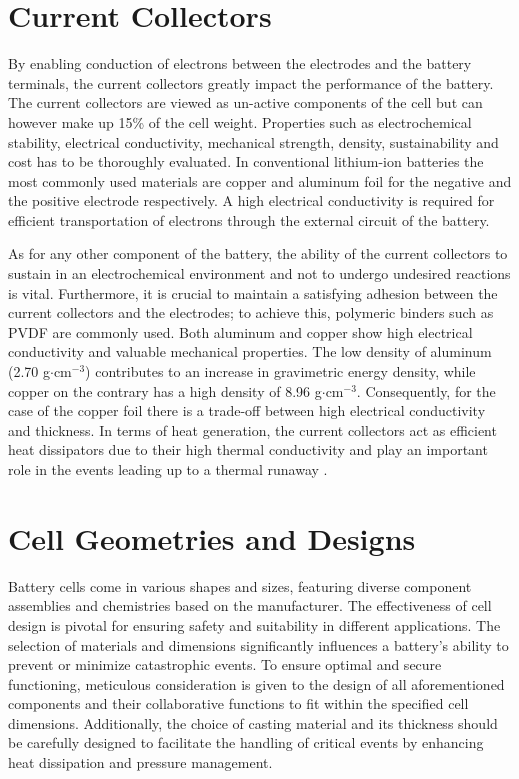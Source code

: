 \section{Current Collectors}
\label{sec:current-collectors}
By enabling conduction of electrons between the electrodes and the battery terminals, the current collectors greatly impact the performance of the battery. The current collectors are viewed as un-active components of the cell but can however make up 15\% of the cell weight. Properties such as electrochemical stability, electrical conductivity, mechanical strength, density, sustainability and cost has to be thoroughly evaluated. In conventional lithium-ion batteries the most commonly used materials are copper and aluminum foil for the negative and the positive electrode respectively. A high electrical conductivity is required for efficient transportation of electrons through the external circuit of the battery. 

As for any other component of the battery, the ability of the current collectors to sustain in an electrochemical environment and not to undergo undesired reactions is vital. Furthermore, it is crucial to maintain a satisfying adhesion between the current collectors and the electrodes; to achieve this, polymeric binders such as PVDF are commonly used. Both aluminum and copper show high electrical conductivity and valuable mechanical properties. The low density of aluminum (2.70 g$\cdot$cm$^{-3}$) contributes to an increase in gravimetric energy density, while copper on the contrary has a high density of 8.96 g$\cdot$cm$^{-3}$. Consequently, for the case of the copper foil there is a trade-off between high electrical conductivity and thickness. In terms of heat generation, the current collectors act as efficient heat dissipators due to their high thermal conductivity and play an important role in the events leading up to a thermal runaway \cite{zhu2021review}.

\section{Cell Geometries and Designs}
\label{sec:cell-geometries-designs}
Battery cells come in various shapes and sizes, featuring diverse component assemblies and chemistries based on the manufacturer. The effectiveness of cell design is pivotal for ensuring safety and suitability in different applications. The selection of materials and dimensions significantly influences a battery's ability to prevent or minimize catastrophic events. To ensure optimal and secure functioning, meticulous consideration is given to the design of all aforementioned components and their collaborative functions to fit within the specified cell dimensions. Additionally, the choice of casting material and its thickness should be carefully designed to facilitate the handling of critical events by enhancing heat dissipation and pressure management.


